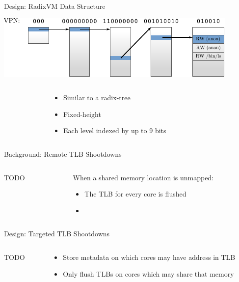 \documentclass[aspectratio=169]{beamer}
\newcommand{\bi}{\begin{itemize}}
\newcommand{\ei}{\end{itemize}}
\begin{document}
\begin{frame}{Design: RadixVM Data Structure}
  \begin{center}
  \includegraphics[scale=1.5]{./figures/radix.pdf}
  \end{center}
  \begin{columns}[T]
    \begin{column}{0.2\textwidth}
    \end{column}
    \begin{column}{0.6\textwidth}
      \bi
    \item Similar to a radix-tree
    \item Fixed-height
    \item Each level indexed by up to 9 bits
      \ei
    \end{column}
    \begin{column}{0.2\textwidth}
    \end{column}
  \end{columns}
\end{frame}

\begin{frame}{Background: Remote TLB Shootdowns}
  \begin{columns}[T]
    \begin{column}{0.2\textwidth}
      TODO
    \end{column}
    \begin{column}{0.8\textwidth}
      When a shared memory location is unmapped:
      \bi
    \item The TLB for every core is flushed
    \item \color{red}{This is expensive!}
      \ei
    \end{column}
  \end{columns}
\end{frame}

\begin{frame}{Design: Targeted TLB Shootdowns}
  \begin{columns}[T]
    \begin{column}{0.2\textwidth}
      TODO
    \end{column}
    \begin{column}{0.8\textwidth}
      \bi
    \item Store metadata on which cores may have address in TLB
    \item Only flush TLBs on cores which may share that memory
      \ei
    \end{column}
  \end{columns}
\end{frame}
\end{document}
